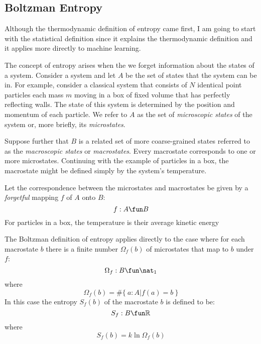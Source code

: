 \documentclass[11pt]{amsart}
\begin{document}
\subsection{Boltzman Entropy}

Although the thermodynamic definition of entropy came first,
I am going to start with the statistical definition since it explains the thermodynamic definition and 
it applies more directly to machine learning.

The concept of entropy arises when the we forget information about the states of a system.
Consider a system and let $A$ be the set of states that the system can be in.
For example, consider a classical system that consists of $N$ identical point particles each mass $m$ moving in a box of fixed volume 
that has perfectly reflecting walls.
The state of this system is determined by the position and momentum of each particle.
We refer to $A$ as the set of {\it microscopic states} of the system or, more briefly, its {\it microstates}.

Suppose further that $B$ is a related set of more coarse-grained states referred to as the {\it macroscopic states} or {\it macrostates}.
Every macrostate corresponds to one or more microstates.
Continuing with the example of particles in a box, the macrostate might be defined simply by the system's temperature.

Let the correspondence between the microstates and macrostates be given by a {\it forgetful} mapping $f$ of $A$ onto $B$:
\begin{equation}
	f: A \fun B
\end{equation}
For particles in a box, the temperature is their average kinetic energy

The Boltzman definition of entropy applies directly to the case where for each macrostate $b$ there is a finite number $\Omega_f(b)$ of microstates
that map to $b$ under $f$:
\begin{equation}
	\Omega_f : B \fun \nat_1
\end{equation}
where
\begin{equation}
	 \Omega_f(b) = \# \{~ a: A | f(a) = b ~\} 
\end{equation}
In this case the entropy $S_f(b)$ of the macrostate $b$ is defined to be:
\begin{equation}
	S_f : B \fun \mathbb{R}
\end{equation}
where
\begin{equation}
	S_f(b) = k \ln \Omega_f(b)
\end{equation}
\end{document}
